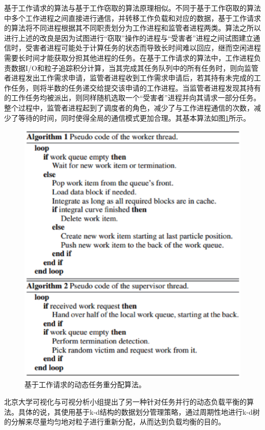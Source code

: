 基于工作请求的算法与基于工作窃取的算法原理相似。不同于基于工作窃取的算法中多个工作进程之间直接进行通信，并转移工作负载和对应的数据，基于工作请求的算法将不同进程根据其不同职责划分为工作进程和监管者进程两类\parencite{MullerCHG13}。算法之所以进行上述的改良是因为试图进行“窃取”操作的进程与“受害者”进程之间试图建立通信时，受害者进程可能处于计算任务的状态而导致长时间难以回应，继而空闲进程需要长时间才能获取分担其他进程的任务。在基于工作请求的算法中，工作进程负责数据I/O和粒子追踪积分计算，当其完成其任务队列中的所有任务时，则向监管者进程发出工作需求申请，监管者进程收到工作需求申请后，若其持有未完成的工作任务，则将半数的任务递交给提交该申请的工作进程。当监管者进程发现其持有的工作任务均被派出，则同样随机选取一个“受害者”进程并向其请求一部分任务。整个过程中，监管者进程起到了调度者的角色，减少了与工作进程通信的次数，减少了等待的时间，同时使得全局的通信模式更加合理。其基本算法如图\ref{fig:loadbalance:workrequesting}所示。

\begin{figure}[!tb]
  \centering
  \includegraphics[width=0.8\linewidth,keepaspectratio]{image/loadbalance/workrequesting.eps}
  \caption{
    基于工作请求的动态任务重分配算法\parencite{MullerCHG13}。
 }
\label{fig:loadbalance:workrequesting}
\end{figure}

北京大学可视化与可视分析小组提出了另一种针对任务并行的动态负载平衡的算法\parencite{ZhangGHYP18}。具体的说，其使用基于k-d结构的数据划分管理策略，通过周期性地进行k-d树的分解来尽量均匀地对粒子进行重新分配，从而达到负载均衡的目的。

